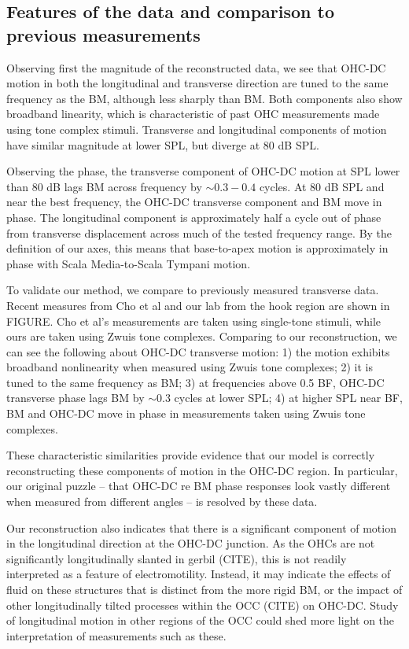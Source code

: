 \documentclass[preprint,NumberedRefs]{JASA}
\begin{document}
\subsection{Features of the data and comparison to previous measurements}
\par{Observing first the magnitude of the reconstructed data, we see that OHC-DC motion in both the longitudinal and transverse direction are tuned to the same frequency as the BM, although less sharply than BM. Both components also show broadband linearity, which is characteristic of past OHC measurements made using tone complex stimuli. Transverse and longitudinal components of motion have similar magnitude at lower SPL, but diverge at 80 dB SPL.}
\par{Observing the phase, the transverse component of OHC-DC motion at SPL lower than 80 dB lags BM across frequency by $\sim 0.3-0.4$ cycles. At 80 dB SPL and near the best frequency, the OHC-DC transverse component and BM move in phase. The longitudinal component is approximately half a cycle out of phase from transverse displacement across much of the tested frequency range. By the definition of our axes, this means that base-to-apex motion is approximately in phase with Scala Media-to-Scala Tympani motion.}
\par{To validate our method, we compare to previously measured transverse data. Recent measures from Cho et al and our lab from the hook region are shown in FIGURE. Cho et al's measurements are taken using single-tone stimuli, while ours are taken using Zwuis tone complexes. Comparing to our reconstruction, we can see the following about OHC-DC transverse motion: 1) the motion exhibits broadband nonlinearity when measured using Zwuis tone complexes; 2) it is tuned to the same frequency as BM; 3) at frequencies above 0.5 BF, OHC-DC transverse phase lags BM by $\sim$0.3 cycles at lower SPL; 4) at higher SPL near BF, BM and OHC-DC move in phase in measurements taken using Zwuis tone complexes. }
\par{These characteristic similarities provide evidence that our model is correctly reconstructing these components of motion in the OHC-DC region. In particular, our original puzzle -- that OHC-DC re BM phase responses look vastly different when measured from different angles -- is resolved by these data.}
\par{Our reconstruction also indicates that there is a significant component of motion in the longitudinal direction at the OHC-DC junction. As the OHCs are not significantly longitudinally slanted in gerbil (CITE), this is not readily interpreted as a feature of electromotility. Instead, it may indicate the effects of fluid on these structures that is distinct from the more rigid BM, or the impact of other longitudinally tilted processes within the OCC (CITE) on OHC-DC. Study of longitudinal motion in other regions of the OCC could shed more light on the interpretation of measurements such as these.}
\end{document}
